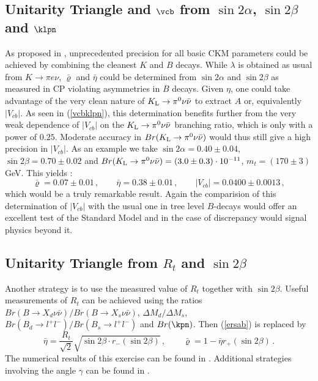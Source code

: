\subsection{Unitarity Triangle and $\vcb$ from $\sin 2\alpha$,
$\sin 2\beta$ and $\klpn$}
As proposed in \cite{AJB94},
unprecedented precision for all basic CKM
parameters could be achieved by combining the cleanest $K$ and 
$B$ decays. 
While $\lambda$ is obtained as usual from
$K\to\pi e\nu$, $\bar\varrho$ and $\bar\eta$ could be determined
from $\sin 2\alpha$ and $\sin 2\beta$ as measured in CP
violating asymmetries in $B$ decays. Given $\eta$, one could
take advantage of the very clean nature of $K_{\rm L}\to\pi^0\nu\bar\nu$
to extract $A$ or, equivalently $|V_{cb}|$. As seen in (\ref{vcbklpn}),
this determination
benefits further from the very weak dependence of $|V_{cb}|$ on
the $K_{\rm L}\to\pi^0\nu\bar\nu$ branching ratio, which is only with
a power of $0.25$. Moderate accuracy in $Br(K_{\rm L}\to\pi^0\nu\bar\nu)$
would thus still give a high precision in $|V_{cb}|$.
As an example we take $\sin 2\alpha=0.40\pm 0.04$,
$\sin 2\beta=0.70\pm 0.02$ and 
$Br(K_{\rm L}\to\pi^0\nu\bar\nu)=(3.0\pm 0.3)\cdot 10^{-11}$,
$m_t=(170\pm 3)$ GeV. 
This yields \cite{BB96}:
\begin{equation}\label{rhetvcb}
\bar\varrho=0.07\pm 0.01\,,\qquad
\bar\eta=0.38\pm 0.01\,,\qquad
|V_{cb}|=0.0400\pm 0.0013\,,
\end{equation}
which would be a truly remarkable result. Again the comparision of
this determination of $|V_{cb}|$ with the usual one in tree level
$B$-decays would offer an excellent test of the Standard Model
and in the case of discrepancy would signal physics beyond 
it.  

\subsection{Unitarity Triangle from $R_t$ and $\sin 2\beta$} 
Another strategy is to use the measured value of $R_t$ together with
$\sin 2\beta$. Useful measurements of $R_t$ can be achieved
using the ratios $Br(B\to X_d \nu\bar\nu)/Br(B\to X_s \nu\bar\nu)$,
$\Delta M_d/\Delta M_s$,
$Br(B_d\to l^+l^-)/Br(B_s \to l^+l^-)$
 and $Br(\kpn)$. Then (\ref{ersab})
is replaced by \cite{B95}
\begin{equation}\label{5a}
\bar\eta=\frac{R_t}{\sqrt{2}}\sqrt{\sin 2\beta \cdot r_{-}(\sin 2\beta)}\,,
\quad\quad
\bar\varrho = 1-\bar\eta r_{+}(\sin 2\beta)\,.
\end{equation}
The numerical results of this exercise can be found in \cite{B95}.
Additional strategies involving the angle $\gamma$ 
can be found in \cite{BLO}.
